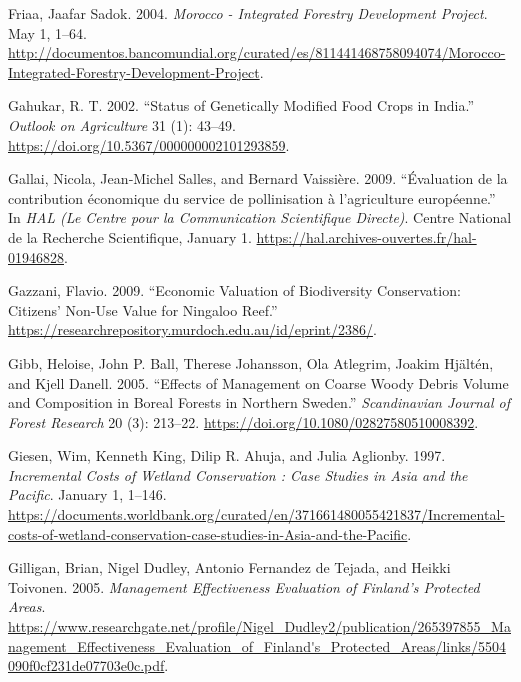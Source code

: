 \begin{CSLReferences}{1}{1}
Friaa, Jaafar Sadok. 2004. \emph{Morocco - Integrated Forestry
Development Project}. May 1, 1--64.
\url{http://documentos.bancomundial.org/curated/es/811441468758094074/Morocco-Integrated-Forestry-Development-Project}.

Gahukar, R. T. 2002. {``Status of Genetically Modified Food Crops in
India.''} \emph{Outlook on Agriculture} 31 (1): 43--49.
\url{https://doi.org/10.5367/000000002101293859}.

Gallai, Nicola, Jean‐Michel Salles, and Bernard Vaissière. 2009.
{``Évaluation de la contribution économique du service de pollinisation
à l'agriculture européenne.''} In \emph{HAL (Le Centre pour la
Communication Scientifique Directe)}. Centre National de la Recherche
Scientifique, January 1.
\url{https://hal.archives-ouvertes.fr/hal-01946828}.

Gazzani, Flavio. 2009. {``Economic Valuation of Biodiversity
Conservation: Citizens' Non-Use Value for Ningaloo Reef.''}
\url{https://researchrepository.murdoch.edu.au/id/eprint/2386/}.

Gibb, Heloise, John P. Ball, Therese Johansson, Ola Atlegrim, Joakim
Hjältén, and Kjell Danell. 2005. {``Effects of Management on Coarse
Woody Debris Volume and Composition in Boreal Forests in Northern
Sweden.''} \emph{Scandinavian Journal of Forest Research} 20 (3):
213--22. \url{https://doi.org/10.1080/02827580510008392}.

Giesen, Wim, Kenneth King, Dilip R. Ahuja, and Julia Aglionby. 1997.
\emph{Incremental Costs of Wetland Conservation : Case Studies in Asia
and the Pacific}. January 1, 1--146.
\url{https://documents.worldbank.org/curated/en/371661480055421837/Incremental-costs-of-wetland-conservation-case-studies-in-Asia-and-the-Pacific}.

Gilligan, Brian, Nigel Dudley, Antonio Fernandez de Tejada, and Heikki
Toivonen. 2005. \emph{Management Effectiveness Evaluation of Finland's
Protected Areas}.
\url{https://www.researchgate.net/profile/Nigel_Dudley2/publication/265397855_Management_Effectiveness_Evaluation_of_Finland's_Protected_Areas/links/5504090f0cf231de07703e0c.pdf}.


\end{CSLReferences}
